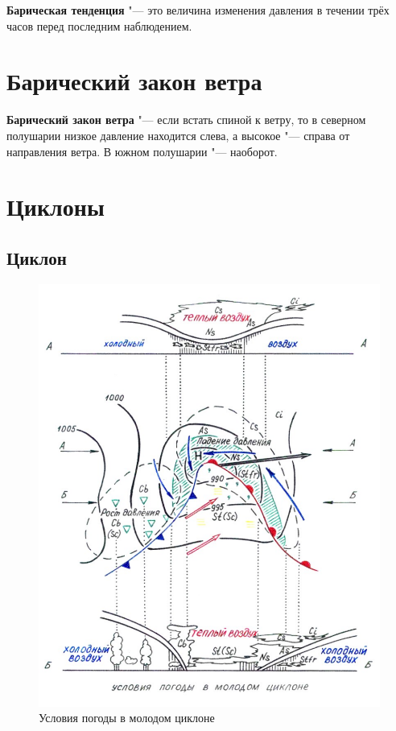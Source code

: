 \documentclass[a4paper, 12pt, twoside, final, book, russian, fittopage, cyremdash, openright]{ncc}
\begin{document}
\textbf{Барическая тенденция} "--- это
величина изменения давления в течении трёх часов перед последним
наблюдением.

\section{Барический закон ветра}
\label{sec:baric_wind_law}

\textbf{Барический закон ветра} "---
если встать спиной к ветру, то в северном полушарии низкое давление
находится слева, а высокое "--- справа от направления ветра. В южном
полушарии "--- наоборот.

\section{Циклоны}

\subsection{Циклон}
\label{sec:cyclon}

\begin{figure}[htb]
   \centering
   \includegraphics[scale=1.0]{03_cyclon.pdf}
   \caption{Условия погоды в молодом циклоне}
   \label{fig:03_cyclon}
\end{figure}
\end{document}
